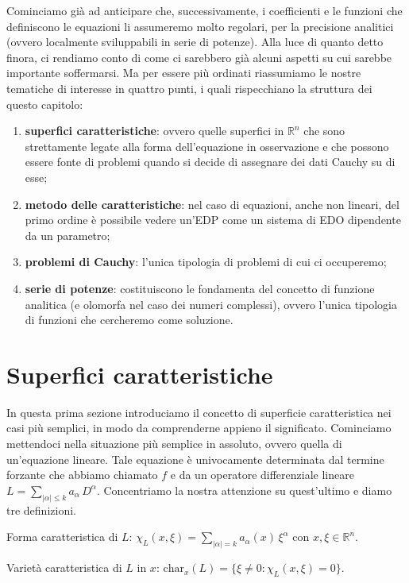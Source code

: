 Cominciamo già ad anticipare che, successivamente, i coefficienti e le funzioni che definiscono le equazioni li assumeremo molto regolari, per la precisione analitici (ovvero localmente sviluppabili in serie di potenze).
\newpage
Alla luce di quanto detto finora, ci rendiamo conto di come ci sarebbero già alcuni aspetti su cui sarebbe importante soffermarsi.
Ma per essere più ordinati riassumiamo le nostre tematiche di interesse in quattro punti, i quali rispecchiano la struttura dei questo capitolo:
\begin{enumerate}
\item \textbf{superfici caratteristiche}: ovvero quelle superfici in $\mathbb{R}^n$ che sono strettamente legate alla forma dell'equazione in osservazione e che possono essere fonte di problemi quando si decide di assegnare dei dati Cauchy su di esse;
\item \textbf{metodo delle caratteristiche}: nel caso di equazioni, anche non lineari, del primo ordine è possibile vedere un'EDP come un sistema di EDO dipendente da un parametro;
\item \textbf{problemi di Cauchy}: l'unica tipologia di problemi di cui ci occuperemo;
\item \textbf{serie di potenze}: costituiscono le fondamenta del concetto di funzione analitica (e olomorfa nel caso dei numeri complessi), ovvero l'unica tipologia di funzioni che cercheremo come soluzione. 
\end{enumerate}


\section{Superfici caratteristiche} \label{supcar}
In questa prima sezione introduciamo il concetto di superficie caratteristica nei casi più semplici, in modo da comprenderne appieno il significato. Cominciamo mettendoci nella situazione più semplice in assoluto, ovvero quella di un'equazione lineare. 
Tale equazione è univocamente determinata dal termine forzante che abbiamo chiamato $f$ e da un operatore differenziale lineare $L=\sum_{|\alpha |\leq k} a_\alpha \, D^\alpha$. Concentriamo la nostra attenzione su quest'ultimo e diamo tre definizioni.

\begin{definition}
Forma caratteristica di $L$:  $\chi_L(x,\xi)=\sum_{|\alpha |= k} a_\alpha(x) \, \xi^\alpha$ con  $x,\xi \in \mathbb{R}^n$.
\end{definition}

\begin{definition}
Varietà caratteristica di $L$ in $x$: $\text{char}_x (L)= \{ \xi \neq 0 : \chi_L(x,\xi)=0 \}$.
\end{definition}

